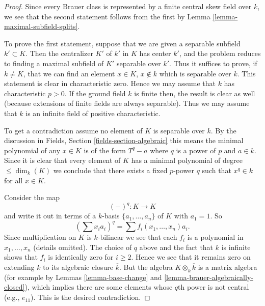 \documentclass[10pt,a4paper]{amsart}
\theoremstyle{plain}
\theoremstyle{definition}
\theoremstyle{remark}
\numberwithin{equation}{subsection}
\begin{document}
\begin{proof}
Since every Brauer class is represented by a finite central skew
field over $k$, we see that the second statement follows from the
first by
Lemma \ref{lemma-maximal-subfield-splits}.

\medskip\noindent
To prove the first statement, suppose that we are given a separable
subfield $k' \subset K$. Then the centralizer $K'$ of $k'$ in $K$
has center $k'$, and the problem reduces to finding a maximal
subfield of $K'$ separable over $k'$. Thus it suffices to prove, if
$k \not = K$, that we can find an element $x \in K$, $x \not \in k$
which is separable over $k$. This statement is clear in characteristic
zero. Hence we may assume that $k$ has characteristic $p > 0$. If the
ground field $k$ is finite then, the result is clear as well (because
extensions of finite fields are always separable). Thus we may assume
that $k$ is an infinite field of positive characteristic.

\medskip\noindent
To get a contradiction assume no element of $K$ is separable over $k$.
By the discussion in
Fields, Section \ref{fields-section-algebraic}
this means the minimal polynomial of any $x \in K$ is of the form
$T^q - a$ where $q$ is a power of $p$ and $a \in k$. Since it is
clear that every element of $K$ has a minimal polynomial of degree
$\leq \dim_k(K)$ we conclude that there exists a fixed $p$-power
$q$ such that $x^q \in k$ for all $x \in K$.

\medskip\noindent
Consider the map
$$
(-)^q : K \longrightarrow K
$$
and write it out in terms of a $k$-basis $\{a_1, \ldots, a_n\}$ of $K$
with $a_1 = 1$. So
$$
(\sum x_i a_i)^q = \sum f_i(x_1, \ldots, x_n)a_i.
$$
Since multiplication on $K$ is $k$-bilinear we see that each $f_i$
is a polynomial in $x_1, \ldots, x_n$ (details omitted).
The choice of $q$ above and the fact that $k$ is infinite shows that
$f_i$ is identically zero for $i \geq 2$. Hence we see that it remains
zero on extending $k$ to its algebraic closure $\overline{k}$. But the
algebra $K \otimes_k \overline{k}$ is a matrix algebra (for example by
Lemmas \ref{lemma-base-change} and \ref{lemma-brauer-algebraically-closed}),
which implies there are some elements whose $q$th power is not central
(e.g., $e_{11}$). This is the desired contradiction.
\end{proof}
\end{document}
